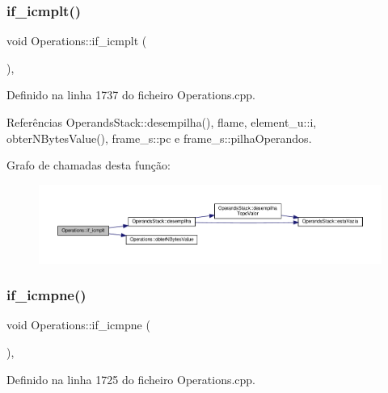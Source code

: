 \subsubsection{\texorpdfstring{if\+\_\+icmplt()}{if\_icmplt()}}
{\footnotesize\ttfamily void Operations\+::if\+\_\+icmplt (\begin{DoxyParamCaption}{ }\end{DoxyParamCaption})\hspace{0.3cm}{\ttfamily [static]}, {\ttfamily [private]}}



Definido na linha 1737 do ficheiro Operations.\+cpp.



Referências Operands\+Stack\+::desempilha(), flame, element\+\_\+u\+::i, obter\+N\+Bytes\+Value(), frame\+\_\+s\+::pc e frame\+\_\+s\+::pilha\+Operandos.

Grafo de chamadas desta função\+:
\nopagebreak
\begin{figure}[H]
\begin{center}
\leavevmode
\includegraphics[width=350pt]{classOperations_a06f624059cfada3f4a726d0482078aaa_cgraph}
\end{center}
\end{figure}
\mbox{\label{classOperations_a52dca630766e37bbaf0e7439c0335273}} 
\subsubsection{\texorpdfstring{if\+\_\+icmpne()}{if\_icmpne()}}
{\footnotesize\ttfamily void Operations\+::if\+\_\+icmpne (\begin{DoxyParamCaption}{ }\end{DoxyParamCaption})\hspace{0.3cm}{\ttfamily [static]}, {\ttfamily [private]}}



Definido na linha 1725 do ficheiro Operations.\+cpp.



